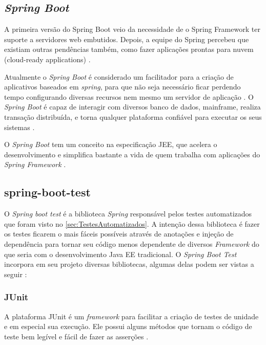 \subsection{\textit{Spring Boot}}\label{subsec:SpringBoot}

A primeira versão do Spring Boot veio da necessidade de o Spring Framework ter suporte a servidores web embutidos. Depois, a equipe do Spring percebeu que existiam outras pendências também, como fazer aplicações prontas para nuvem (cloud-ready applications) \cite{Boagrio:2017}.

Atualmente o \textit{Spring Boot} é considerado um facilitador para a criação de aplicativos baseados em \textit{spring}, para que não seja necessário ficar perdendo tempo configurando diversas recursos nem mesmo um servidor de aplicação \cite{springBoot:2017}. O \textit{Spring Boot} é capaz de interagir com diversos banco de dados, mainframe, realiza transação distribuída, e torna qualquer plataforma confiável para executar os seus sistemas \cite{Boagrio:2017}.

O \textit{Spring Boot} tem um conceito na especificação JEE, que acelera o desenvolvimento e simplifica bastante a vida de quem trabalha com aplicações do \textit{Spring Framework} \cite{Boagrio:2017}.

\subsection{spring-boot-test}\label{subsec:SpringTest}

O \textit{Spring boot test} é a biblioteca \textit{Spring} responsável pelos testes automatizados que foram  visto no \autoref{sec:TestesAutomatizados}. A intenção dessa biblioteca é fazer os testes ficarem o mais fáceis possíveis através de anotações e injeção de dependência para tornar seu código menos dependente de diversos \textit{Framework} do que seria com o desenvolvimento Java EE tradicional. 
O \textit{Spring Boot Test} incorpora em seu projeto diversas bibliotecas, algumas delas podem ser vistas a seguir \cite{springBootTest:2017}:

\subsubsection{JUnit}\label{subsec:JUnit}
	
	A plataforma JUnit é um \textit{framework} para facilitar a criação de testes de unidade e em especial sua execução. Ele possui alguns métodos que tornam o código de teste bem legível e fácil de fazer as asserções \cite{junit:2017}.

